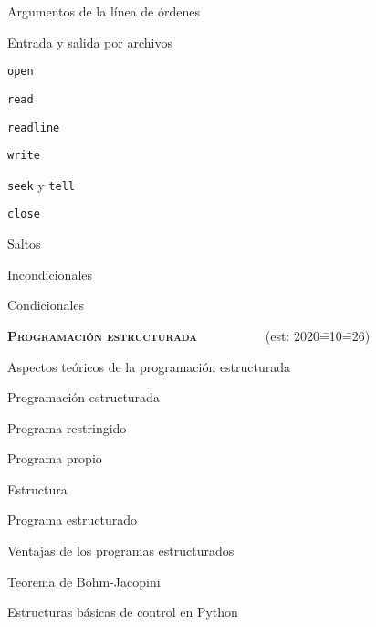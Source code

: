 \begin{longenum}
\begin{longenum}
\begin{longenum}
\begin{longenum}
                \item Argumentos de la línea de órdenes
            \end{longenum}
            \item Entrada y salida por archivos 
            \begin{longenum}
                \item \texttt{open}
                \item \texttt{read}
                \item \texttt{readline}
                \item \texttt{write}
                \item \texttt{seek} y \texttt{tell}
                \item \texttt{close}
            \end{longenum}
        \end{longenum}
        \item Saltos
        \begin{longenum}
            \item Incondicionales
            \item Condicionales
        \end{longenum}
    \end{longenum}
    \item \textbf{\textsc{Programación estructurada}} \ \ \ \ \ \ \ \ \ \ (est: 2020\==10\==26)
    \begin{longenum}
        \item Aspectos teóricos de la programación estructurada
        \begin{longenum}
            \item Programación estructurada
            \item Programa restringido
            \item Programa propio
            \item Estructura
            \item Programa estructurado
            \begin{longenum}
                \item Ventajas de los programas estructurados
            \end{longenum}
            \item Teorema de Böhm-Jacopini
        \end{longenum}
        \item Estructuras básicas de control en Python

\end{longenum}
\end{longenum}

